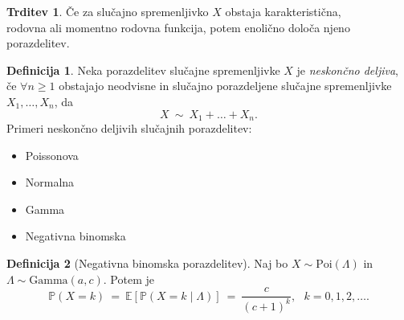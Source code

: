 \documentclass[11pt]{article}
\renewcommand{\P}{\mathbb{P}}
\newcommand{\E}{\mathbb{E}}
\theoremstyle{definition}
\newtheorem{definicija}{Definicija}[section]
\theoremstyle{definition}
\newtheorem{trditev}{Trditev}[section]
\theoremstyle{definition}
\theoremstyle{definition}
\begin{document}
\begin{trditev}

Če za slučajno spremenljivko $X$ obstaja karakteristična, \\rodovna ali momentno rodovna funkcija, potem enolično določa njeno \\porazdelitev.

\end{trditev}
\vspace{0.5cm}

\begin{definicija}

Neka porazdelitev slučajne spremenljivke $X$ je \textit{neskončno deljiva}, če $\forall n \geq 1$ obstajajo neodvisne in slučajno porazdeljene slučajne spremenljivke $X_1,\ldots,X_n$, da
$$X ~\sim~ X_1 + \ldots + X_n.$$
Primeri neskončno deljivih slučajnih porazdelitev:
\begin{itemize}
	\item Poissonova
	\item Normalna
	\item Gamma
	\item Negativna binomska
\end{itemize}

\end{definicija}
\vspace{0.5cm}

\begin{definicija}[Negativna binomska porazdelitev]

Naj bo $X \sim \text{Poi}(\Lambda)$ in $\Lambda \sim \text{Gamma}(a,c)$. Potem je
$$\P(X = k) ~=~ \E[\P(X =k \mid \Lambda)] ~=~ \frac{c}{(c+1)^k}, ~~~k = 0,1,2,\ldots.$$

\end{definicija}
\vspace{0.5cm}


\pagebreak

\end{document}
